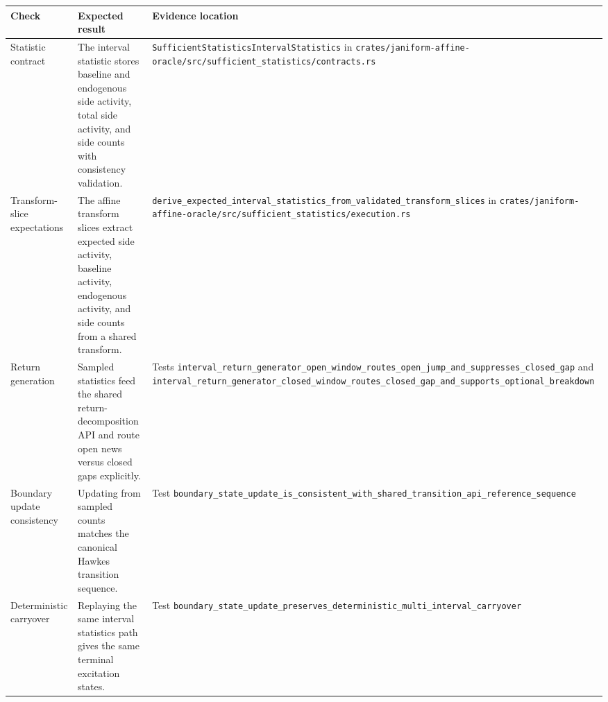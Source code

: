\documentclass[11pt]{article}
\begin{document}
\begin{tabularx}{\textwidth}{XXX}
\toprule
Check & Expected result & Evidence location\\
\midrule
Statistic contract
& The interval statistic stores baseline and endogenous side activity, total side activity, and side counts with consistency validation.
& \texttt{SufficientStatisticsIntervalStatistics} in \texttt{crates/janiform-affine-oracle/src/sufficient\_statistics/contracts.rs}\\
Transform-slice expectations
& The affine transform slices extract expected side activity, baseline activity, endogenous activity, and side counts from a shared transform.
& \texttt{derive\_expected\_interval\_statistics\_from\_validated\_transform\_slices} in \texttt{crates/janiform-affine-oracle/src/sufficient\_statistics/execution.rs}\\
Return generation
& Sampled statistics feed the shared return-decomposition API and route open news versus closed gaps explicitly.
& Tests \texttt{interval\_return\_generator\_open\_window\_routes\_open\_jump\_and\_suppresses\_closed\_gap} and \texttt{interval\_return\_generator\_closed\_window\_routes\_closed\_gap\_and\_supports\_optional\_breakdown}\\
Boundary update consistency
& Updating from sampled counts matches the canonical Hawkes transition sequence.
& Test \texttt{boundary\_state\_update\_is\_consistent\_with\_shared\_transition\_api\_reference\_sequence}\\
Deterministic carryover
& Replaying the same interval statistics path gives the same terminal excitation states.
& Test \texttt{boundary\_state\_update\_preserves\_deterministic\_multi\_interval\_carryover}\\
\bottomrule
\end{tabularx}
\end{document}
